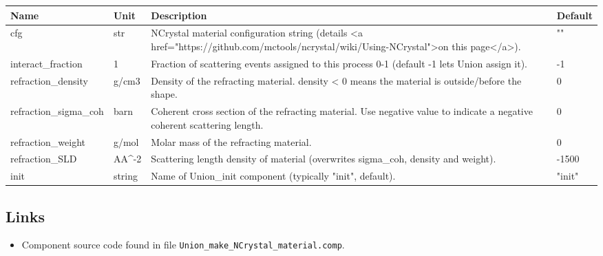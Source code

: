 \begin{longtable}{p{}p{}p{}p{}}
\toprule
\textbf{Name} & \textbf{Unit} & \textbf{Description} & \textbf{Default} \\
\midrule
\endhead
cfg & str & NCrystal material configuration string (details \textless{}a href="https://github.com/mctools/ncrystal/wiki/Using-NCrystal"\textgreater{}on this page\textless{}/a\textgreater{}). & "" \\
interact\_fraction & 1 & Fraction of scattering events assigned to this process 0-1 (default -1 lets Union assign it). & -1 \\
refraction\_density & g/cm3 & Density of the refracting material. density \textless{} 0 means the material is outside/before the shape. & 0 \\
refraction\_sigma\_coh & barn & Coherent cross section of the refracting material. Use negative value to indicate a negative coherent scattering length. & 0 \\
refraction\_weight & g/mol & Molar mass of the refracting material. & 0 \\
refraction\_SLD & AA\textasciicircum{}-2 & Scattering length density of material (overwrites sigma\_coh, density and weight). & -1500 \\
init & string & Name of Union\_init component (typically "init", default). & "init" \\
\bottomrule
\end{longtable}

\subsection*{Links}
\begin{itemize}
  \item Component source code found in file \texttt{Union\_make\_NCrystal\_material.comp}.
\end{itemize}
